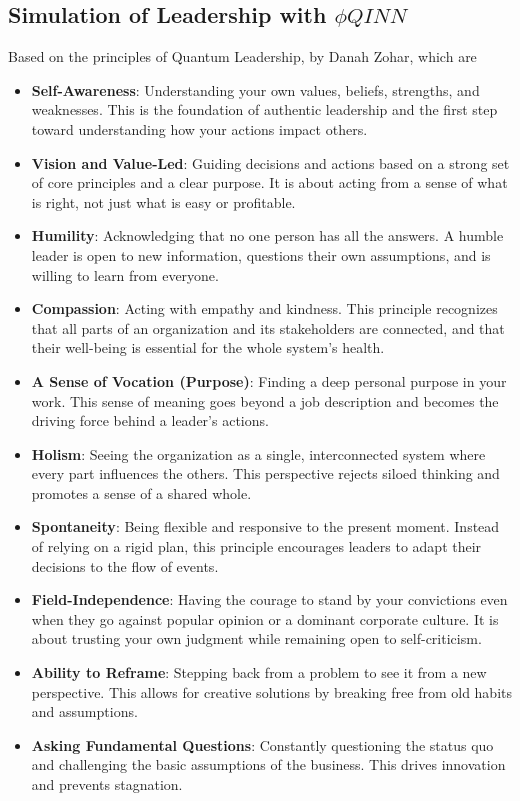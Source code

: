 \documentclass{article}
\begin{document}
\subsection{Simulation of Leadership with $\phi QINN$}
Based on the principles of Quantum Leadership, by Danah Zohar, which are
\begin{itemize}
\item \textbf{Self-Awareness}: Understanding your own values, beliefs, strengths, and weaknesses. This is the foundation of authentic leadership and the first step toward understanding how your actions impact others.
\item \textbf{Vision and Value-Led}: Guiding decisions and actions based on a strong set of core principles and a clear purpose. It is about acting from a sense of what is right, not just what is easy or profitable.
\item \textbf{Humility}: Acknowledging that no one person has all the answers. A humble leader is open to new information, questions their own assumptions, and is willing to learn from everyone.
\item \textbf{Compassion}: Acting with empathy and kindness. This principle recognizes that all parts of an organization and its stakeholders are connected, and that their well-being is essential for the whole system's health.
\item \textbf{A Sense of Vocation (Purpose)}: Finding a deep personal purpose in your work. This sense of meaning goes beyond a job description and becomes the driving force behind a leader's actions.
\item \textbf{Holism}: Seeing the organization as a single, interconnected system where every part influences the others. This perspective rejects siloed thinking and promotes a sense of a shared whole.
\item \textbf{Spontaneity}: Being flexible and responsive to the present moment. Instead of relying on a rigid plan, this principle encourages leaders to adapt their decisions to the flow of events.
\item \textbf{Field-Independence}: Having the courage to stand by your convictions even when they go against popular opinion or a dominant corporate culture. It is about trusting your own judgment while remaining open to self-criticism.
\item \textbf{Ability to Reframe}: Stepping back from a problem to see it from a new perspective. This allows for creative solutions by breaking free from old habits and assumptions.
\item \textbf{Asking Fundamental Questions}: Constantly questioning the status quo and challenging the basic assumptions of the business. This drives innovation and prevents stagnation.

\end{itemize}
\end{document}
